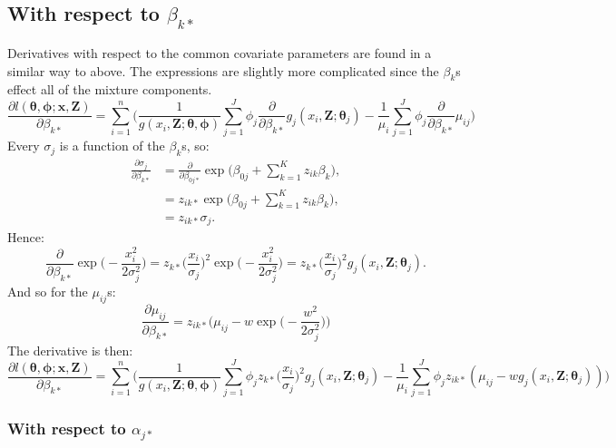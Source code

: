 \documentclass[useAMS,referee, usegraphicx]{biom}
\begin{document}
\subsection*{With respect to $\beta_{k*}$}

Derivatives with respect to the common covariate parameters are found in a similar way to above. The expressions are slightly more complicated since the $\beta_k$s effect all of the mixture components.
\begin{equation*}
\frac{\partial l(\bm{\theta},\bm{\phi}; \mathbf{x},\mathbf{Z})}{\partial \beta_{k*}} = \sum_{i=1}^n \Big( \frac{1}{g(x_i,\mathbf{Z}; \bm{\theta},\bm{\phi})} \sum_{j=1}^J \phi_j \frac{\partial}{\partial \beta_{k*}} g_j(x_i,\mathbf{Z}; \bm{\theta}_j) - \frac{1}{\mu_i} \sum_{j=1}^J \phi_j \frac{\partial}{\partial \beta_{k*}}\mu_{ij}\Big)
\end{equation*}
Every $\sigma_{j}$ is a function of the $\beta_{k}$s, so:
\begin{align*}
\frac{\partial \sigma_{j}}{\partial \beta_{k*}} &= \frac{\partial}{\partial \beta_{0j*}} \exp \Big( \beta_{0j} + \sum_{k=1}^K z_{ik} \beta_{k}\Big),\\
&= z_{ik*} \exp \Big( \beta_{0j} + \sum_{k=1}^K z_{ik} \beta_{k}\Big),\\
&= z_{ik*}\sigma_{j}.
\end{align*}
Hence:
\begin{equation*}
 \frac{\partial}{\partial \beta_{k*}} \exp\Big( -\frac{x_i^2}{2\sigma_{j}^2} \Big) = z_{k*} \Big( \frac{x_i}{\sigma_{j}}\Big)^2 \exp \Big(-\frac{x_i^2}{2 \sigma_{j}^2}\Big) = z_{k*} \Big( \frac{x_i}{\sigma_{j}}\Big)^2 g_j(x_i,\mathbf{Z}; \bm{\theta}_j).
 \label{detfct-deriv-k}
\end{equation*}
And so for the $\mu_{ij}$s:
\begin{equation*}
\frac{\partial \mu_{ij}}{\partial \beta_{k*}} = z_{ik*} \Big( \mu_{ij} - w \exp\Big( -\frac{w^2}{2\sigma_{j}^2} \Big) \Big)
\end{equation*}
The derivative is then:
\begin{equation*}
\frac{\partial l(\bm{\theta},\bm{\phi}; \mathbf{x},\mathbf{Z})}{\partial \beta_{k*}} = \sum_{i=1}^n \Big( \frac{1}{g(x_i,\mathbf{Z}; \bm{\theta},\bm{\phi})} \sum_{j=1}^J \phi_j  z_{k*} \Big( \frac{x_i}{\sigma_{j}}\Big)^2 g_j(x_i,\mathbf{Z}; \bm{\theta}_j) - \frac{1}{\mu_i} \sum_{j=1}^J \phi_j z_{ik*} ( \mu_{ij} - w g_j(x_i,\mathbf{Z}; \bm{\theta}_j) )\Big)
\end{equation*}

\subsubsection*{With respect to $\alpha_{j*}$}
\end{document}
